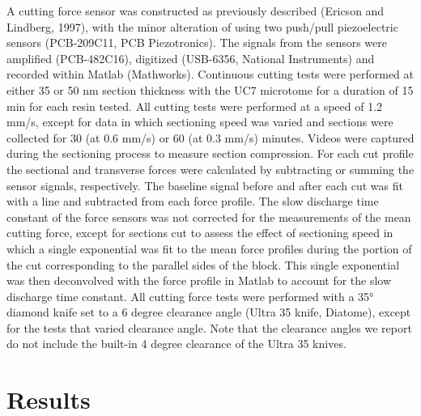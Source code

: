 \documentclass{article}
\begin{document}
A cutting force sensor was constructed as previously described (Ericson and Lindberg, 1997), with the minor alteration of using two push/pull piezoelectric sensors (PCB-209C11, PCB Piezotronics). The signals from the sensors were amplified (PCB-482C16), digitized (USB-6356, National Instruments) and recorded within Matlab (Mathworks). Continuous cutting tests were performed at either 35 or 50 nm section thickness with the UC7 microtome for a duration of 15 min for each resin tested. All cutting tests were performed at a speed of 1.2 mm/s, except for data in which sectioning speed was varied and sections were collected for 30 (at 0.6 mm/s) or 60 (at 0.3 mm/s) minutes. Videos were captured during the sectioning process to measure section compression. For each cut profile the sectional and transverse forces were calculated by subtracting or summing the sensor signals, respectively. The baseline signal before and after each cut was fit with a line and subtracted from each force profile. The slow discharge time constant of the force sensors was not corrected for the measurements of the mean cutting force, except for sections cut to assess the effect of sectioning speed in which a single exponential was fit to the mean force profiles during the portion of the cut corresponding to the parallel sides of the block. This single exponential was then deconvolved with the force profile in Matlab to account for the slow discharge time constant. All cutting force tests were performed with a 35° diamond knife set to a 6 degree clearance angle (Ultra 35 knife, Diatome), except for the tests that varied clearance angle. Note that the clearance angles we report do not include the built-in 4 degree clearance of the Ultra 35 knives.

\section*{Results}
\end{document}
